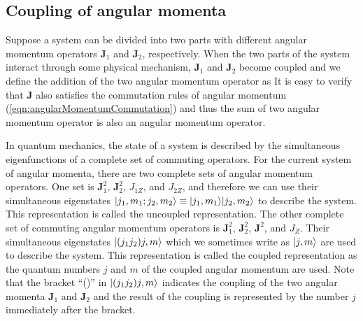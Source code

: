 \subsection{Coupling of angular momenta}

Suppose a system can be divided into two parts with different angular momentum operators $\mathbf{J}_1$ and $\mathbf{J}_2$, 
respectively. When the two parts of the system interact through some physical mechanism, $\mathbf{J}_1$ and 
$\mathbf{J}_2$ become coupled and we define the addition of the two angular momentum operator as
It is easy to verify that $\mathbf{J}$ also satisfies the commutation rules of angular momentum
 (\autoref{eqn:angularMomentumCommutation}) and thus the sum of two angular momentum operator  is also an angular momentum operator.

In quantum mechanics, the state of a system is described by the simultaneous eigenfunctions of a complete set of 
commuting operators. For the current system of angular momenta, there are two complete sets of angular momentum
operators.  One set is $\mathbf{J}_1^2$, $\mathbf{J}_2^2$, $J_{1Z}$, and $J_{2Z}$, and therefore we can use their
simultaneous eigenstates $| j_1, m_1; j_2, m_2 \rangle\equiv | j_1, m_1 \rangle| j_2, m_2 \rangle$ to describe the system.
This representation is called the uncoupled representation. The other complete set of commuting angular 
 momentum operators is $\mathbf{J}_1^2$, $\mathbf{J}_2^2$, $\mathbf{J}^2$, and $J_Z$. Their simultaneous 
 eigenstates $| (j_1 j_2)j, m \rangle$ which we sometimes write as $| j, m \rangle$ are used to describe the system. This
  representation is called the coupled representation as the quantum numbers $j$ and $m$ of the coupled angular 
  momentum are used. Note that the bracket ``()'' in $| (j_1 j_2)j, m \rangle$ indicates the coupling of the two 
  angular momenta $\mathbf{J}_1$ and $\mathbf{J}_2$ and the result of the coupling is represented by the number $j$ immediately after the bracket.

